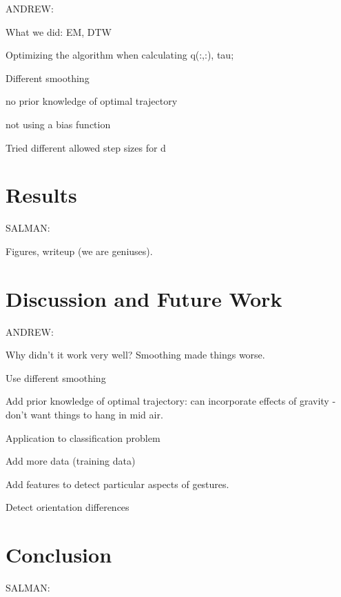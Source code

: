 \documentclass{article}
\begin{document}
ANDREW:

What we did: EM, DTW

Optimizing the algorithm when calculating q(:,:), tau;

Different smoothing

no prior knowledge of optimal trajectory

not using a bias function

Tried different allowed step sizes for d

\section{Results}

SALMAN:

Figures, writeup (we are geniuses).

\section{Discussion and Future Work}

ANDREW:

Why didn't it work very well? Smoothing made things worse.

Use different smoothing

Add prior knowledge of optimal trajectory: can incorporate effects of gravity - don't want things to hang in mid air.

Application to classification problem

Add more data (training data)

Add features to detect particular aspects of gestures.

Detect orientation differences

\section{Conclusion}

SALMAN:




\end{document}
